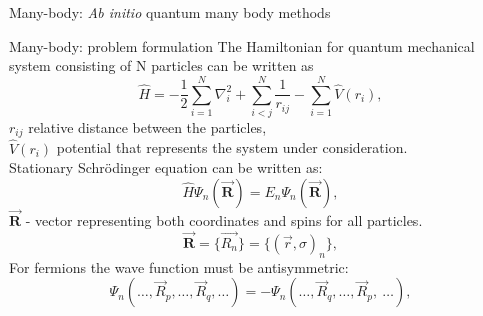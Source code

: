 \documentclass{beamer}
\begin{document}
  \begin{frame}{Many-body: \textit{Ab initio} quantum many body methods}
   \end{frame}
  \begin{frame}{Many-body: problem formulation}
The Hamiltonian for quantum mechanical system consisting of N particles  can be written as
\begin{equation*}
\hat{H} = -\frac{1}{2}\sum_{i=1}^{N} \nabla_i^2 + \sum_{i<j}^{N}\frac{1}{r_{ij}} - \sum_{i=1}^{N} \hat{V}(r_i),
\end{equation*}
$r_{ij}$  relative distance between the particles, \\
$\hat{V}(r_i)$  potential that represents the system under consideration.\\

Stationary Schr\"{o}dinger equation can be written as:
\begin{equation*}
\hat{H}\Psi_n(\vec{\textbf{R}}) = E_n\Psi_n(\vec{\textbf{R}}),
\end{equation*}
$\vec{\textbf{R}}$ - vector representing both coordinates and spins for all particles.
\begin{equation*}
\vec{\textbf{R}} = \{\vec{R_n}\}= \{(\vec{r}, \sigma)_n\},
\end{equation*}
For fermions the wave function must be antisymmetric:
\begin{equation*}
\Psi_n({\dots, \vec{R}_p , \dots, \vec{R}_q, \dots}) = -\Psi_n({\dots, \vec{R}_q , \dots, \vec{R}_p, \ \dots}),
\end{equation*}
\end{frame}
\end{document}
